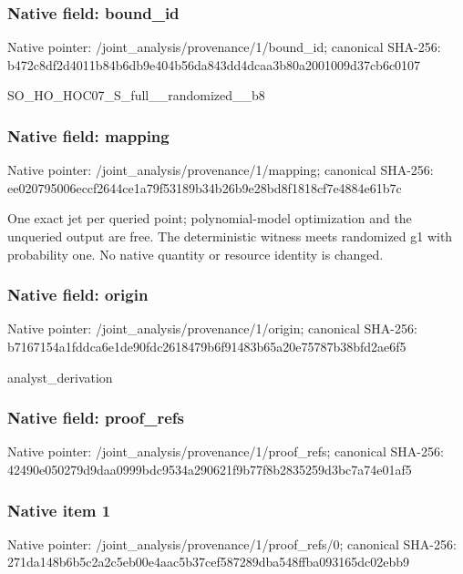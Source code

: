 \documentclass[10pt,a4paper]{article}
\begin{document}
\subsubsection{Native field: bound\_\allowbreak{}id}
Native pointer: /joint\_\allowbreak{}analysis/provenance/1/bound\_\allowbreak{}id; canonical SHA-256: b472c8df2d4011b84b6db9e404b56da843dd4dcaa3b80a2001009d37cb6c0107

\begingroup\raggedright\sloppy SO\_\allowbreak{}HO\_\allowbreak{}HOC07\_\allowbreak{}S\_\allowbreak{}full\_\allowbreak{}\_\allowbreak{}randomized\_\allowbreak{}\_\allowbreak{}b8\par\endgroup

\subsubsection{Native field: mapping}
Native pointer: /joint\_\allowbreak{}analysis/provenance/1/mapping; canonical SHA-256: ee020795006eccf2644ce1a79f53189b34b26b9e28bd8f1818cf7e4884e61b7c

\begingroup\raggedright\sloppy One exact jet per queried point;\allowbreak{} polynomial-model optimization and the unqueried output are free. The deterministic witness meets randomized g1 with probability one. No native quantity or resource identity is changed.\par\endgroup

\subsubsection{Native field: origin}
Native pointer: /joint\_\allowbreak{}analysis/provenance/1/origin; canonical SHA-256: b7167154a1fddca6e1de90fdc2618479b6f91483b65a20e75787b38bfd2ae6f5

\begingroup\raggedright\sloppy analyst\_\allowbreak{}derivation\par\endgroup

\subsubsection{Native field: proof\_\allowbreak{}refs}
Native pointer: /joint\_\allowbreak{}analysis/provenance/1/proof\_\allowbreak{}refs; canonical SHA-256: 42490e050279d9daa0999bdc9534a290621f9b77f8b2835259d3bc7a74e01af5

\subsubsection{Native item 1}
Native pointer: /joint\_\allowbreak{}analysis/provenance/1/proof\_\allowbreak{}refs/0; canonical SHA-256: 271da148b6b5c2a2c5eb00e4aac5b37cef587289dba548ffba093165dc02ebb9
\end{document}
